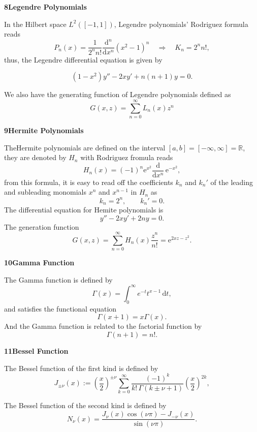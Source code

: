\documentclass[12pt]{article}
\newcommand{\problem}[2]{%
    \par\vspace{1em}
    \noindent\textbf{#1\quad #2}
    \par\smallskip
}
\begin{document}
\pagebreak
\problem{8}{Legendre Polynomials}
In the Hilbert space $L^2([-1,1])$, Legendre polynomials' Rodriguez formula reads
\begin{equation}
    P_n(x) = \frac{1}{2^nn!}\frac{\mathrm{d}^n}{\mathrm{d}x^n}(x^2 - 1)^n \quad \Longrightarrow \quad K_n = 2^nn!,
\end{equation}
thus, the Legendre differential equation is given by

\begin{equation}
    (1 - x^2)y'' - 2xy' + n(n+1)y = 0.
\end{equation}

We also have the generating function of Legendre polynomials defined as
\begin{equation}
    G(x,z) = \sum_{n=0}^{\infty}L_n(x)z^n
\end{equation}

\problem{9}{Hermite Polynomials}
TheHermite polynomials are defined on the interval $[a,b] = [-\infty,\infty]=\mathbb{R}$, they are denoted by $H_n$ with Rodriguez fromula reads
\begin{equation}
    H_n(x) = (-1)^n\mathrm{e}^{x^2}\frac{\mathrm{d}}{\mathrm{d}x^n}\,\mathrm{e}^{-x^2},
\end{equation}
from this formula, it is easy to read off the coefficients $k_n$ and $k_n'$ of the leading and subleading monomials $x^n$ and $x^{n-1}$ in $H_n$ as
\begin{equation}
    k_n = 2^n, \qquad k_n' = 0.
\end{equation}
The differential equation for Hemite polynomials is
\begin{equation}
    y'' - 2xy' + 2ny = 0.
\end{equation}
The generation function
\begin{equation}
    G(x,z) = \sum_{n=0}^{\infty}H_n(x)\frac{z^n}{n!} = \mathrm{e}^{2xz - z^2}.
\end{equation}

\problem{10}{Gamma Function}
The Gamma function is defined by
\begin{equation}
    \Gamma(x) = \int_{0}^{\infty}e^{-t}t^{x-1}\,\mathrm{d}t,
\end{equation}
and satisfies the functional equation
\begin{equation}
    \Gamma(x+1) = x\Gamma(x).
\end{equation}
And the Gamma function is related to the factorial function by
\begin{equation}
    \Gamma(n+1) = n!.
\end{equation}

\problem{11}{Bessel Function}
The Bessel function of the first kind is defined by
\begin{equation}
    J_{\pm \nu}(x) := \left(\frac{x}{2}\right)^{\pm \nu}\sum_{k=0}^{\infty}\frac{(-1)^k}{k!\,\Gamma(k\pm \nu+1)}\left(\frac{x}{2}\right)^{2k},
\end{equation}

The Bessel function of the second kind is defined by
\begin{equation}
    N_{\nu}(x) = \frac{J_{\nu}(x) \cos(\nu \pi) - J_{-\nu}(x)}{\sin(\nu \pi)}.
\end{equation}
\end{document}
